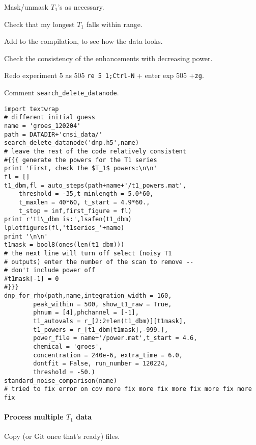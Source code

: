 Mask/unmask $T_1$'s as necessary.

Check that my longest $T_1$ falls within range.

Add to the compilation, to see how the data looks.

Check the consistency of the enhancements with decreasing power.

Redo experiment 5 as 505 \texttt{re 5 1;Ctrl-N} + enter exp 505 +\texttt{zg}.

Comment {\tt search\_delete\_datanode}.


\begin{scriptsize}
\begin{lstlisting}
import textwrap
# different initial guess
name = 'groes_120204'
path = DATADIR+'cnsi_data/'
search_delete_datanode('dnp.h5',name)
# leave the rest of the code relatively consistent
#{{{ generate the powers for the T1 series
print 'First, check the $T_1$ powers:\n\n'
fl = []
t1_dbm,fl = auto_steps(path+name+'/t1_powers.mat',
    threshold = -35,t_minlength = 5.0*60,
    t_maxlen = 40*60, t_start = 4.9*60.,
    t_stop = inf,first_figure = fl)
print r't1\_dbm is:',lsafen(t1_dbm)
lplotfigures(fl,'t1series_'+name)
print '\n\n'
t1mask = bool8(ones(len(t1_dbm)))
# the next line will turn off select (noisy T1
# outputs) enter the number of the scan to remove --
# don't include power off
#t1mask[-1] = 0
#}}}
dnp_for_rho(path,name,integration_width = 160,
        peak_within = 500, show_t1_raw = True,
        phnum = [4],phchannel = [-1],
        t1_autovals = r_[2:2+len(t1_dbm)][t1mask],
        t1_powers = r_[t1_dbm[t1mask],-999.],
        power_file = name+'/power.mat',t_start = 4.6,
        chemical = 'groes',
        concentration = 240e-6, extra_time = 6.0,
        dontfit = False, run_number = 120224,
        threshold = -50.)
standard_noise_comparison(name)
# tried to fix error on cov more fix more fix more fix more fix more fix
\end{lstlisting}
\end{scriptsize}

\paragraph{Process multiple $T_1$ data}
Copy (or Git once that's ready) files.

